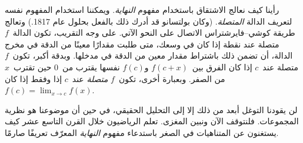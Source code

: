 \documentclass[../../../include/open-logic-section]{subfiles}
\begin{document}
رأينا كيف نعالج الاشتقاق باستخدام مفهوم \emph{النهاية}. ويمكننا
استخدام المفهوم نفسه لتعريف الدالة \emph{المتصلة}. (وكان بولتسانو قد
أدرك ذلك بالفعل بحلول عام 1817.) وتعالج طريقة كوشي--فايرشتراس الاتصال
على النحو الآتي. على وجه التقريب، تكون الدالة~$f$ متصلة عند نقطة إذا
كان في وسعك، متى طلبت مقدارًا معينًا من الدقة في مخرج الدالة، أن تضمن
ذلك باشتراط مقدار معين من الدقة في مدخلها. وبدقة أكبر، تكون~$f$ متصلة
عند~$c$ إذا كان الفرق بين~$f(c + x)$ و$f(c)$ نفسها يقترب من~$0$ حين
تقترب~$x$ من الصفر. وبعبارة أخرى، تكون~$f$ \emph{متصلة} عند~$c$ إذا
وفقط إذا كان~$f(c) = \lim_{x \rightarrow c} f(x)$.

لن يقودنا التوغل أبعد من ذلك إلا إلى التحليل الحقيقي، في حين أن
موضوعنا هو نظرية المجموعات. فلنتوقف الآن ونبين المغزى. تعلم الرياضيون
خلال القرن التاسع عشر كيف يستغنون عن المتناهيات في الصغر باستدعاء
مفهوم \emph{النهاية} المعرّف تعريفًا صارمًا.
\end{document}
